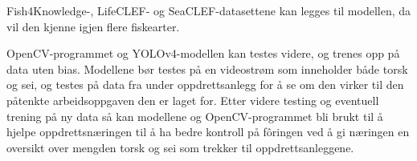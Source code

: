 Fish4Knowledge-, LifeCLEF- og SeaCLEF-datasettene kan legges til modellen, da vil den kjenne igjen flere fiskearter.

OpenCV-programmet og YOLOv4-modellen kan testes videre, og trenes opp på data uten bias. Modellene bør testes på en videostrøm som inneholder både torsk og sei, og testes på data fra under oppdrettsanlegg for å se om den virker til den påtenkte arbeidsoppgaven den er laget for. Etter videre testing og eventuell trening på ny data så kan modellene og OpenCV-programmet bli brukt til å hjelpe oppdrettsnæringen til å ha bedre kontroll på fôringen ved å gi næringen en oversikt over mengden torsk og sei som trekker til oppdrettsanleggene.

